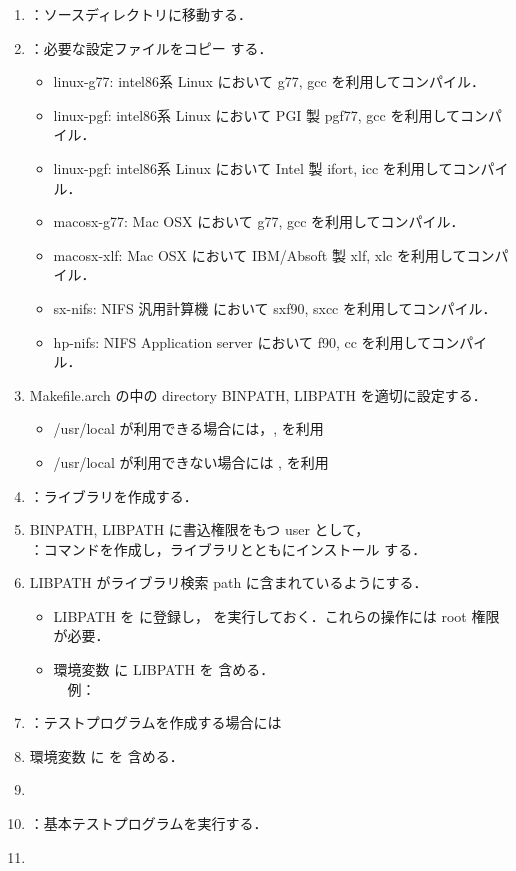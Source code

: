 \documentclass[11pt]{jarticle}
\begin{document}
\begin{enumerate}
\item
{}：ソースディレクトリに移動する．
\item
{}：必要な設定ファイルをコピー
する．
\begin{itemize}
\item
linux-g77: intel86系 Linux において g77, gcc を利用してコンパイル．
\item
linux-pgf: intel86系 Linux において PGI 製 pgf77, gcc を利用してコンパイル．
\item
linux-pgf: intel86系 Linux において Intel 製 ifort, icc を利用してコンパイル．
\item
macosx-g77: Mac OSX において g77, gcc を利用してコンパイル．
\item
macosx-xlf: Mac OSX において IBM/Absoft 製 xlf, xlc を利用してコンパイル．
\item
sx-nifs: NIFS 汎用計算機 において sxf90, sxcc を利用してコンパイル．
\item
hp-nifs: NIFS Application server において f90, cc を利用してコンパイル．
\end{itemize}

\item
Makefile.arch の中の directory BINPATH, LIBPATH を適切に設定する．
\begin{itemize}
\item
/usr/local が利用できる場合には，, 
を利用
\item
/usr/local が利用できない場合には , を利用
\end{itemize}

\item
{}：ライブラリを作成する．
\item
BINPATH, LIBPATH に書込権限をもつ user として，\\
：コマンドを作成し，ライブラリとともにインストール
する．
\item
LIBPATH がライブラリ検索 path に含まれているようにする．
\begin{itemize}
\item
LIBPATH を  に登録し，
を実行しておく．これらの操作には root 権限が必要．
\item
環境変数  に LIBPATH を
含める．\\
\qquad　例：
\end{itemize}
\item
{}：テストプログラムを作成する場合には
\item
環境変数  に  を
含める．\\
\qquad{}
\item
{}
\item
{}：基本テストプログラムを実行する．
\item
{}
\end{enumerate}
\end{document}

